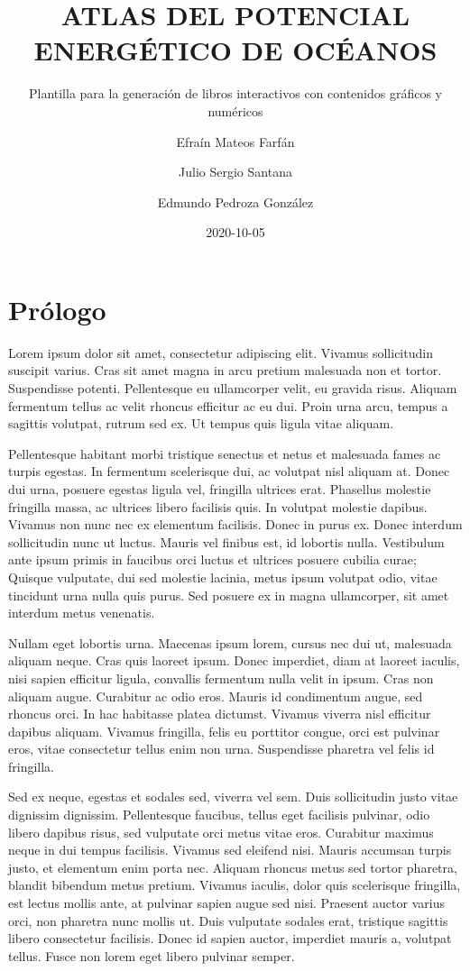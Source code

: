 \documentclass[
]{article}
\title{ATLAS DEL POTENCIAL ENERGÉTICO DE OCÉANOS}
\subtitle{Plantilla para la generación de libros interactivos con contenidos gráficos y numéricos}
\author{Efraín Mateos Farfán \and Julio Sergio Santana \and Edmundo Pedroza González}
\date{2020-10-05}
\begin{document}
\maketitle

{
\setcounter{tocdepth}{2}
\tableofcontents
}
\hypertarget{pruxf3logo}{%
\section{Prólogo}\label{pruxf3logo}}

Lorem ipsum dolor sit amet, consectetur adipiscing elit. Vivamus sollicitudin suscipit varius. Cras sit amet magna in arcu pretium malesuada non et tortor. Suspendisse potenti. Pellentesque eu ullamcorper velit, eu gravida risus. Aliquam fermentum tellus ac velit rhoncus efficitur ac eu dui. Proin urna arcu, tempus a sagittis volutpat, rutrum sed ex. Ut tempus quis ligula vitae aliquam.

Pellentesque habitant morbi tristique senectus et netus et malesuada fames ac turpis egestas. In fermentum scelerisque dui, ac volutpat nisl aliquam at. Donec dui urna, posuere egestas ligula vel, fringilla ultrices erat. Phasellus molestie fringilla massa, ac ultrices libero facilisis quis. In volutpat molestie dapibus. Vivamus non nunc nec ex elementum facilisis. Donec in purus ex. Donec interdum sollicitudin nunc ut luctus. Mauris vel finibus est, id lobortis nulla. Vestibulum ante ipsum primis in faucibus orci luctus et ultrices posuere cubilia curae; Quisque vulputate, dui sed molestie lacinia, metus ipsum volutpat odio, vitae tincidunt urna nulla quis purus. Sed posuere ex in magna ullamcorper, sit amet interdum metus venenatis.

Nullam eget lobortis urna. Maecenas ipsum lorem, cursus nec dui ut, malesuada aliquam neque. Cras quis laoreet ipsum. Donec imperdiet, diam at laoreet iaculis, nisi sapien efficitur ligula, convallis fermentum nulla velit in ipsum. Cras non aliquam augue. Curabitur ac odio eros. Mauris id condimentum augue, sed rhoncus orci. In hac habitasse platea dictumst. Vivamus viverra nisl efficitur dapibus aliquam. Vivamus fringilla, felis eu porttitor congue, orci est pulvinar eros, vitae consectetur tellus enim non urna. Suspendisse pharetra vel felis id fringilla.

Sed ex neque, egestas et sodales sed, viverra vel sem. Duis sollicitudin justo vitae dignissim dignissim. Pellentesque faucibus, tellus eget facilisis pulvinar, odio libero dapibus risus, sed vulputate orci metus vitae eros. Curabitur maximus neque in dui tempus facilisis. Vivamus sed eleifend nisi. Mauris accumsan turpis justo, et elementum enim porta nec. Aliquam rhoncus metus sed tortor pharetra, blandit bibendum metus pretium. Vivamus iaculis, dolor quis scelerisque fringilla, est lectus mollis ante, at pulvinar sapien augue sed nisi. Praesent auctor varius orci, non pharetra nunc mollis ut. Duis vulputate sodales erat, tristique sagittis libero consectetur facilisis. Donec id sapien auctor, imperdiet mauris a, volutpat tellus. Fusce non lorem eget libero pulvinar semper.
\end{document}
